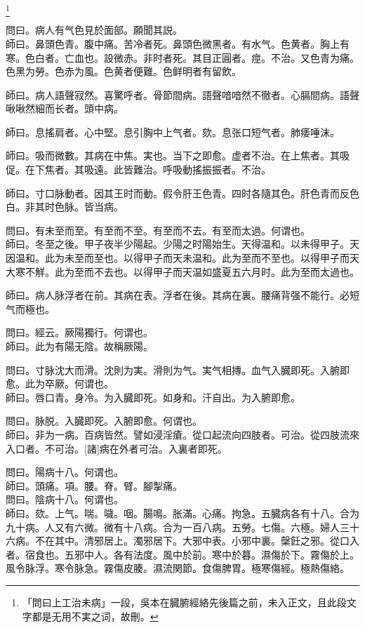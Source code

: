 \documentclass[12pt,oneside,UTF8,b5paper]{ctexbook}她她她她她她她
\begin{document}
	\footnote{「問曰上工治未病」一段，吳本在臓腑經絡先後篇之前，未入正文，且此段文字都是无用不実之词，故刪。}

問曰。病人有气色見於面部。願聞其説。\\
師曰。鼻頭色青。腹中痛。苦冷者死。鼻頭色微黑者。有水气。色黄者。胸上有寒。色白者。亡血也。設微赤。非时者死。其目正圓者。痙。不治。又色青为痛。色黑为勞。色赤为風。色黄者便難。色鲜明者有留飲。

師曰。病人語聲寂然。喜驚呼者。骨節間病。語聲喑喑然不徹者。心膈間病。語聲啾啾然細而长者。頭中病。

師曰。息搖肩者。心中堅。息引胸中上气者。欬。息张口短气者。肺痿唾沫。

師曰。吸而微數。其病在中焦。実也。当下之即愈。虚者不治。在上焦者。其吸促。在下焦者。其吸遠。此皆難治。呼吸動搖振振者。不治。

師曰。寸口脉動者。因其王时而動。假令肝王色青。四时各隨其色。肝色青而反色白。非其时色脉。皆当病。

問曰。有未至而至。有至而不至。有至而不去。有至而太過。何谓也。\\
師曰。冬至之後。甲子夜半少陽起。少陽之时陽始生。天得温和。以未得甲子。天因温和。此为未至而至也。以得甲子而天未温和。此为至而不至也。以得甲子而天大寒不觧。此为至而不去也。以得甲子而天温如盛夏五六月时。此为至而太過也。

師曰。病人脉浮者在前。其病在表。浮者在後。其病在裏。腰痛背强不能行。必短气而極也。

問曰。經云。厥陽獨行。何谓也。\\
師曰。此为有陽无陰。故稱厥陽。

問曰。寸脉沈大而滑。沈則为実。滑則为气。実气相摶。血气入臓即死。入腑即愈。此为卒厥。何谓也。\\
師曰。唇口青。身冷。为入臓即死。如身和。汗自出。为入腑即愈。

問曰。脉脱。入臓即死。入腑即愈。何谓也。\\
師曰。非为一病。百病皆然。譬如浸淫瘡。從口起流向四肢者。可治。從四肢流來入口者。不可治。[諸]病在外者可治。入裏者即死。

問曰。陽病十八。何谓也。\\
師曰。頭痛。項。腰。脊。臂。腳掣痛。\\
問曰。陰病十八。何谓也。\\
師曰。欬。上气。喘。噦。咽。腸鳴。胀滿。心痛。拘急。五臓病各有十八。合为九十病。人又有六微。微有十八病。合为一百八病。五勞。七傷。六極。婦人三十六病。不在其中。清邪居上。濁邪居下。大邪中表。小邪中裏。䅽飪之邪。從口入者。宿食也。五邪中人。各有法度。風中於前。寒中於暮。濕傷於下。霧傷於上。風令脉浮。寒令脉急。霧傷皮腠。濕流関節。食傷脾胃。極寒傷經。極熱傷絡。
\end{document}
